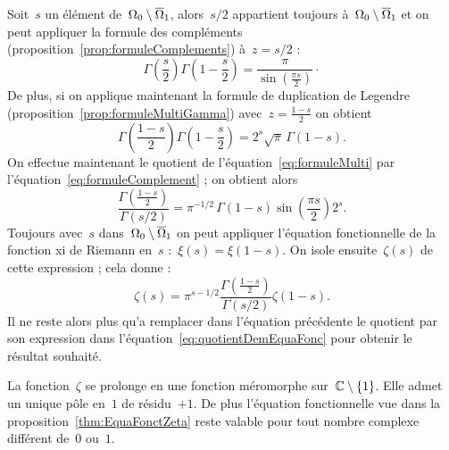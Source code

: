 		\begin{dem}
			Soit~$s$ un élément de~$\Omega_0\setminus\overline{\Omega}_1$, alors~$s/2$ appartient toujours à~$\Omega_0\setminus\overline{\Omega}_1$ et on peut appliquer la formule des compléments (proposition~\ref{prop:formuleComplements}) à~$z=s/2$ :
			\begin{equation}\label{eq:formuleComplement}
				\Gamma\left(\frac{s}{2}\right)\Gamma\left(1-\frac{s}{2}\right) 
						= \frac{\pi}{\sin\left(\frac{\pi s}{2}\right)}\cdot
			\end{equation}
			De plus, si on applique maintenant la formule de duplication de Legendre (proposition~\ref{prop:formuleMultiGamma}) avec~$z=\frac{1-s}{2}$ on obtient
			\begin{equation}\label{eq:formuleMulti}
				\Gamma\left(\frac{1-s}{2}\right)\Gamma\left(1-\frac{s}{2}\right)
					=2^s\sqrt{\pi}\,\Gamma(1-s).
			\end{equation}
			On effectue maintenant le quotient de l'équation~\eqref{eq:formuleMulti} par l'équation~\eqref{eq:formuleComplement} ; on obtient alors 
			\begin{equation}\label{eq:quotientDemEquaFonc}
				\frac{\Gamma\left(\frac{1-s}{2}\right)}{\Gamma(s/2)}
					= \pi^{-1/2}\,\Gamma(1-s)\sin\left(\frac{\pi s}{2}\right) 2^s.
			\end{equation}
			Toujours avec~$s$ dans~$\Omega_0\setminus\overline{\Omega}_1$ on peut appliquer l'équation fonctionnelle de la fonction xi de Riemann en~$s$ :~$\xi(s)=\xi(1-s)$. On isole ensuite~$\zeta(s)$ de cette expression ; cela donne :
			\[
				\zeta(s) 
					= \pi^{s-1/2}\frac{\Gamma\left(\frac{1-s}{2}\right)}{\Gamma(s/2)}\zeta(1-s).
			\]
			Il ne reste alors plus qu'a remplacer dans l'équation précédente le quotient par son expression dans l'équation~\eqref{eq:quotientDemEquaFonc} pour obtenir le résultat souhaité.
		\end{dem}
		\begin{coro}	\label{coro:ZetaMeroC}
			La fonction~$\zeta$ se prolonge en une fonction méromorphe sur~$\mathbb{C}\setminus\{1\}$. Elle admet un unique pôle en~$1$ de résidu~$+1$. De plus l'équation fonctionnelle vue dans la proposition~\ref{thm:EquaFonctZeta} reste valable pour tout nombre complexe différent de~$0$ ou~$1$.
		\end{coro}
